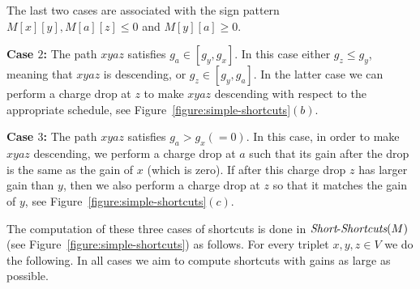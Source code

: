 \documentclass[11pt]{article}
\newcommand{\Simple}{\mbox{{\it Short}-{\it Shortcuts}}}
\begin{document}
The last two cases are associated with the sign pattern $M[x][y],M[a][z]\le 0$ and $M[y][a]\ge 0$.

\textbf{Case $2$:} The path $xyaz$ satisfies  $g_a\in [g_y,g_x]$. In this case either $g_z \le g_y$, meaning that $xyaz$ is descending, or $g_z \in [g_y,g_a]$. In the latter case we can perform a charge drop at $z$ to make $xyaz$ descending with respect to the appropriate schedule, see Figure~\ref{figure:simple-shortcuts}$(b)$.

\textbf{Case $3$:} The path $xyaz$ satisfies $g_a > g_x (= 0)$. In this case, in order to make $xyaz$ descending, we perform a charge drop at $a$ such that its gain after the drop is the same as the gain of $x$ (which is zero). If after this charge drop $z$ has larger gain than $y$, then we also perform a charge drop at $z$ so that it matches the gain of $y$, see Figure~\ref{figure:simple-shortcuts}$(c)$.


The computation of these three cases of shortcuts is done in $\Simple(M)$ (see Figure~\ref{figure:simple-shortcuts}) as follows. For every triplet $x,y,z\in V$ we do the following. In all cases we aim to compute shortcuts with gains as large as possible.
\end{document}
